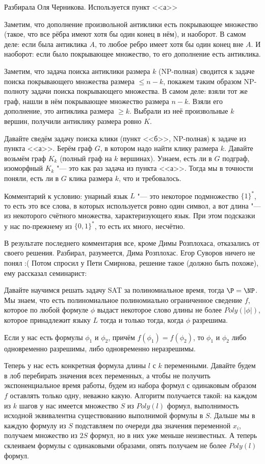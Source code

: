	Разбирала Оля Черникова.
	Используется пункт <<а>>

	Заметим, что дополнение произвольной антиклики есть покрывающее множество (такое,
	что все рёбра имеют хотя бы один конец в нём), и наоборот.
	В самом деле: если была антиклика $A$, то любое ребро имеет хотя бы один конец вне $A$.
	И наоборот: если было покрывающее множество, то его дополнение есть антиклика.

	Заметим, что задача поиска антиклики размера $k$ (NP-полная) сводится к задаче поиска
	покрывающего множества размера $\le n-k$, покажем таким образом NP-полноту задачи
	поиска покрывающего множества.
	В самом деле: взяли тот же граф, нашли в нём покрывающее множество размера $n-k$.
	Взяли его дополнение, это антиклика размера $\ge k$.
	Выбрали из неё произвольные $k$ вершин, получили антиклику размера ровно $K$.

	Давайте сведём задачу поиска клики (пункт <<б>>, NP-полная) к задаче из пункта <<а>>.
	Берём граф $G$, в котором надо найти клику размера $k$.
	Давайте возьмём граф $K_k$ (полный граф на $k$ вершинах).
	Узнаем, есть ли в $G$ подграф, изоморфный $K_k$ "--- это как раз задача из пункта <<а>>.
	Тогда мы в точности поняли, есть ли в $G$ клика размера $k$, что и требовалось.

	Комментарий к условию: унарный язык $L$ "--- это некоторое подмножество $\{1\}^*$,
	то есть это все слова, в которых используется ровно один символ, а вот длина "--- из некоторого
	счётного множества, характеризующего язык.
	При этом подсказки у нас по-прежнему из $\{0,1\}^*$, то есть их много, несчётно.

	В результате последнего комментария все, кроме Димы Розплохаса, отказались от своего решения.
	Разбирал, разумеется, Дима Розплохас.
	Егор Суворов ничего не понял :(
	Потом спросил у Пети Смирнова, решение такое (должно быть похоже), ему рассказал семинарист:

	Давайте научимся решать задачу SAT за полиномиальное время, тогда $\P=\NP$.
	Мы знаем, что есть полиномиальное полиномиально ограниченное сведение $f$,
	которое по любой формуле $\phi$ выдаст некоторое слово длины не более $Poly(|\phi|)$,
	которое принадлежит языку $L$ тогда и только тогда, когда $\phi$ разрешима.
	\begin{assertion}
		Если у нас есть формулы $\phi_1$ и $\phi_2$, причём $f(\phi_1) = f(\phi_2)$,
		то $\phi_1$ и $\phi_2$ либо одновременно разрешимы, либо одновременно неразрешимы.
	\end{assertion}
	Теперь у нас есть конкретная формула длины $l$ с $k$ переменными.
	Давайте будем в лоб перебирать значения всех переменных, а чтобы не получить экспоненциальное
	время работы, будем из набора формул с одинаковым образом $f$ оставлять только одну, неважно какую.
	Алгоритм получается такой: на каждом из $k$ шагов у нас имеется множество $S$ из $Poly(l)$
	формул, выполнимость исходной эквивалентна существованию выполнимой формулы в $S$.
	Дальше мы в каждую формулу из $S$ подставляем по очереди два значения переменной $x_i$,
	получаем множество из $2S$ формул, но в них уже меньше неизвестных.
	А теперь склеиваем формулы с одинаковыми образами, опять получаем не более $Poly(l)$ формул.

